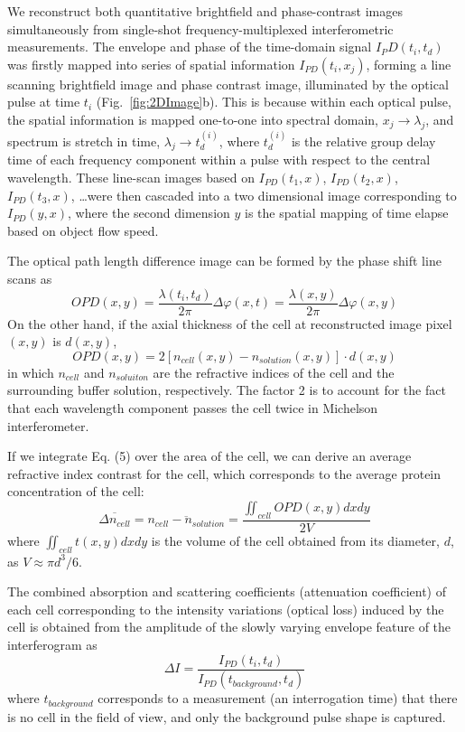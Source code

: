 \documentclass[aps,pra,reprint,superscriptaddress]{revtex4-1}
\begin{document}
We reconstruct both quantitative brightfield and phase-contrast images simultaneously from single-shot frequency-multiplexed interferometric measurements. The envelope and phase of the time-domain signal $I_PD (t_i,t_d)$ was firstly mapped into series of spatial information $I_{PD}(t_i,x_j)$, forming a line scanning brightfield image and phase contrast image, illuminated by the optical pulse at time $t_i$ (Fig.~\ref{fig:2DImage}b). This is because within each optical pulse, the spatial information is mapped one-to-one into spectral domain, $x_j \rightarrow \lambda_j$, and spectrum is stretch in time, $\lambda_j \rightarrow t_d^{(i)}$, where $t_d^{(i)}$ is the relative group delay time of each frequency component within a pulse with respect to the central wavelength. These line-scan images based on $I_{PD}(t_1,x)$, $I_{PD} (t_2,x)$, $I_{PD} (t_3,x)$, \ldots were then cascaded into a two dimensional image corresponding to $I_{PD}(y,x)$, where the second dimension $y$ is the spatial mapping of time elapse based on object flow speed. 

The optical path length difference image can be formed by the phase shift line scans as
\begin{equation}
OPD(x,y) = \frac{\lambda(t_i,t_d)}{2\pi} \Delta\varphi(x,t) = \frac{\lambda(x,y)}{2\pi} \Delta\varphi(x,y)
\end{equation}
On the other hand, if the axial thickness of the cell at reconstructed image pixel $(x,y)$ is $d(x,y)$,
\begin{equation}
OPD(x,y) = 2 [n_{cell}(x,y) - n_{solution}(x,y)] \cdot d(x,y)
\end{equation}
in which $n_{cell}$ and $n_{soluiton}$ are the refractive indices of the cell and the surrounding buffer solution, respectively. The factor 2 is to account for the fact that each wavelength component passes the cell twice in Michelson interferometer. 

If we integrate Eq. (5) over the area of the cell, we can derive an average refractive index contrast for the cell, which corresponds to the average protein concentration of the cell:
\begin{equation}
\overline{\Delta n_{cell}} = \overline{n_{cell} - n_{solution}} = \frac{\iint_{cell} OPD(x,y) dx dy}{2 V}
\end{equation}
where $\iint_{cell} t(x,y) dx dy$ is the volume of the cell obtained from its diameter, $d$, as $V \approx \pi d^3/6$. 

The combined absorption and scattering coefficients (attenuation coefficient) of each cell corresponding to the intensity variations (optical loss) induced by the cell is obtained from the amplitude of the slowly varying envelope feature of the interferogram as
\begin{equation}
\Delta I = \frac{I_{PD}(t_i,t_d)}{I_{PD}(t_{background},t_d)}
\end{equation}
where $t_{background}$ corresponds to a measurement (an interrogation time) that there is no cell in the field of view, and only the background pulse shape is captured. 
\end{document}
